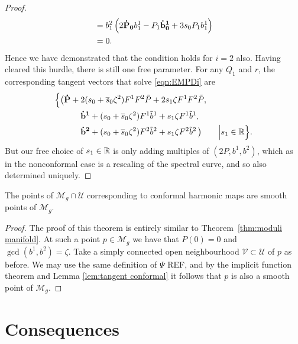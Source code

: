 \documentclass{article}
\begin{document}
\begin{lem}[Case (v)]
\begin{proof}
\begin{align*}
&= b^2_1\left(2 \mathbf{\dot{P}_0} b^1_1 - P_1 \mathbf{\dot{b}^1_0} + 3 s_0 P_1 b^1_1 \right) \\
&= 0.
\end{align*}
Hence we have demonstrated that the condition holds for $i=2$ also. Having cleared this hurdle, there is still one free parameter. For any $Q_1$ and $r$, the corresponding tangent vectors that solve \eqref{eqn:EMPDi} are
\begin{align*}
\Big\{
\big(&\mathbf{\dot P} + 2(s_0+\overline{s}_0\zeta^2) F^1F^2\tilde{P} + 2s_1\zeta F^1F^2\tilde{P}, \\
&\qquad\mathbf{\dot b^1} + (s_0+\overline{s}_0\zeta^2) F^1\tilde{b}^1 + s_1\zeta F^1\tilde{b}^1, \\
&\qquad\mathbf{\dot b^2} + (s_0+\overline{s}_0\zeta^2) F^2\tilde{b}^2 + s_1\zeta F^2\tilde{b}^2 \,\big)
\qquad\Big\vert s_1 \in \mathbb{R}
\Big\}.
\end{align*}
But our free choice of $s_1\in\mathbb{R}$ is only adding multiples of $(2P,b^1,b^2)$, which as in the nonconformal case is a rescaling of the spectral curve, and so also determined uniquely.
\end{proof}
\end{lem}





\begin{thm}
\label{thm:conformal moduli manifold}
The points of $\mathcal{M}_g \cap \mathcal{U}$ corresponding to conformal harmonic maps are smooth points of $\mathcal{M}_g$.

\begin{proof}
The proof of this theorem is entirely similar to Theorem~\ref{thm:moduli manifold}. At such a point $p\in\mathcal{M}_g$ we have that $P(0) = 0$ and $\gcd(b^1,b^2)=\zeta$. Take a simply connected open neighbourhood $\mathcal{V}\subset \mathcal{U}$ of $p$ as before. We may use the same definition of $\Psi$ REF, and by the implicit function theorem and Lemma \ref{lem:tangent conformal} it follows that $p$ is also a smooth point of $\mathcal{M}_g$.
\end{proof}
\end{thm}


\section{Consequences}
\end{document}
